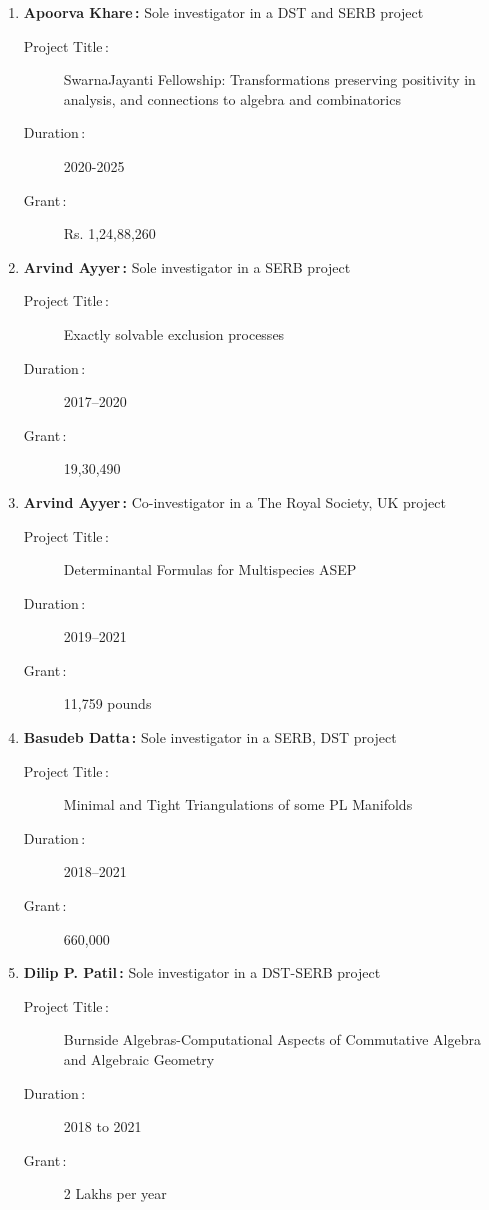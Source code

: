 \begin{enumerate}
\item {\bf Apoorva Khare\,:} Sole investigator in a DST and SERB project
\begin{description}
  \item[Project Title\,:] SwarnaJayanti Fellowship: Transformations preserving positivity in analysis, and connections to algebra and combinatorics
  \item[Duration\,:] 2020-2025
  \item[Grant\,:] Rs. 1,24,88,260
\end{description}


\item {\bf Arvind Ayyer\,:} Sole investigator in a SERB project
\begin{description}
  \item[Project Title\,:]  Exactly solvable exclusion processes
  \item[Duration\,:] 2017--2020
  \item[Grant\,:] 19,30,490
\end{description}


\item {\bf Arvind Ayyer\,:} Co-investigator in a The Royal Society, UK project
\begin{description}
  \item[Project Title\,:] Determinantal Formulas for Multispecies ASEP  
  \item[Duration\,:] 2019--2021
  \item[Grant\,:] 11,759 pounds
\end{description}


\item {\bf Basudeb Datta\,:} Sole investigator in a SERB, DST project
\begin{description}
  \item[Project Title\,:] Minimal and Tight Triangulations of some PL Manifolds
  \item[Duration\,:] 2018--2021
  \item[Grant\,:] 660,000
\end{description}


\item {\bf Dilip P. Patil\,:} Sole investigator in a DST-SERB project
\begin{description}
  \item[Project Title\,:] Burnside Algebras-Computational Aspects of Commutative Algebra and Algebraic Geometry
  \item[Duration\,:] 2018 to 2021
  \item[Grant\,:] 2 Lakhs per year
\end{description}



\end{enumerate}
